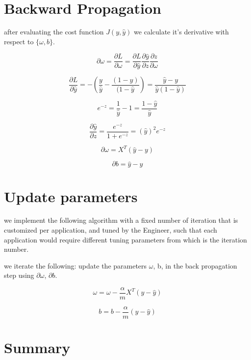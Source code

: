 \documentclass[4apaper,12pt]{book}
\begin{document}
\section{Backward Propagation}
\begin{description}
\item after evaluating the cost function $J(y,\hat{y})$ we calculate it's derivative with respect to  $\{\omega,b\}$.

\item $$\partial{\omega}= \frac{\partial{L}}{\partial{\omega}}=
  \frac{\partial{L}}{\partial{\hat{y}}}
  \frac{\partial{\hat{y}}}{\partial{z}}
  \frac{\partial{z}}{\partial{\omega}}$$
\item $$
  \frac{\partial{L}}{\partial{\hat{y}}} = -
  (\frac{y}{\hat{y}} - \frac{(1-y)}{(1-\hat{y}}) =
  \frac{\hat{y}-y}{\hat{y}(1-\hat{y})}
  $$

\item $$e^{-z}=\frac{1}{\hat{y}} - 1=\frac{1-\hat{y}}{\hat{y}}$$
\item $$
  \frac{\partial{\hat{y}}}{\partial{z}} =
  \frac{e^{-z}}{1+e^{-z}} = (\hat{y})^2e^{-z}
  $$
\item $$ \partial{\omega} = X^T(\hat{y} - y) $$
\item $$ \partial{b} = \hat{y} - y $$
\end{description}

\section{Update parameters}
\begin{description}
  \item we implement the following algorithm with a fixed number of iteration that is customized per application, and tuned by the Engineer, such that each application would require different tuning parameters from which is the iteration number.
\item we iterate the following: update the parameters $\omega$, b, in the back propagation step using $\partial{\omega}$, $\partial{b}$.
\item $$\omega = \omega - \frac{\alpha}{m}X^T(y-\hat{y})$$
\item $$b = b - \frac{\alpha}{m}(y-\hat{y})$$

  \end{description}

\section{Summary}
\begin{description}
  \item
\end{description}
\end{document}
